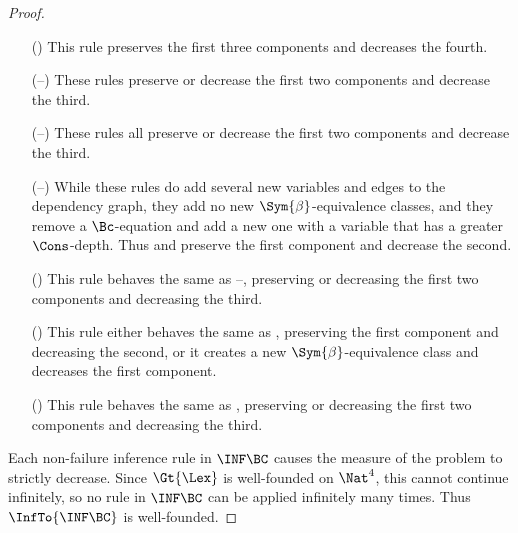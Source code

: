 \begin{proof}
    \begin{itemize}[align=left]
        \item[(\InfRef{triv-elim})] This rule preserves the first three
            components and decreases the fourth.

        \item[(\InfRef{var-elim}--\InfRef{cancel-cons})] These rules preserve
            or decrease the first two components and decrease the third.
    \end{itemize}

    \begin{itemize}[align=left]
        \item[(\InfRef{nil-soln-1}--\InfRef{semi-cancel-bc})] These rules all
            preserve or decrease the first two components and decrease the
            third.

        \item[(\InfRef{push-bc-below}--\InfRef{splitting})] While these rules
            do add several new variables and edges to the dependency graph,
            they add no new $\Sym{\beta}$-equivalence classes, and they remove
            a $\Bc$-equation and add a new one with a variable that has a
            greater $\Cons$-depth. Thus  and
             preserve the first component and decrease the
            second.

        \item[(\InfRef{nil-soln-nondet})] This rule behaves the same as
            --, preserving or
            decreasing the first two components and decreasing the third.

        \item[(\InfRef{non-nil-nondet})] This rule either behaves the same as
            , preserving the first component and
            decreasing the second, or it creates a new
            $\Sym{\beta}$-equivalence class and decreases the first component.

        \item[(\InfRef{cancel-bc-nondet})] This rule behaves the same as
            , preserving or decreasing the first two
            components and decreasing the third.
    \end{itemize}

    Each non-failure inference rule in $\INF\BC$ causes the measure of the
    problem to strictly decrease. Since $\Gt{\Lex}$ is well-founded on $\Nat^4$,
    this cannot continue infinitely, so no rule in $\INF\BC$ can be applied
    infinitely many times. Thus $\InfTo{\INF\BC}$ is well-founded.
\end{proof}



